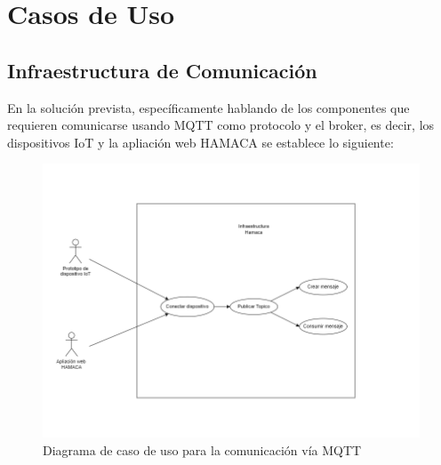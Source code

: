 

\chapter{Casos de Uso}

\section{Infraestructura de Comunicación}
En la solución prevista, específicamente hablando de los componentes que requieren comunicarse usando MQTT como protocolo y el broker, es decir, los dispositivos IoT y la apliación web HAMACA se establece lo siguiente:

\begin{figure}[htb]
\vspace*{-10pt}
\centering
\includegraphics[scale=0.65]{./Figuras/caso_de_uso_mqtt.png}
\caption{Diagrama de caso de uso para la comunicación vía MQTT}
\label{fig:caso_de_uso_mqtt}
\end{figure}

